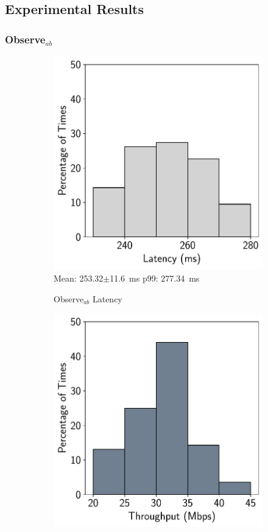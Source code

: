\subsection{Experimental Results}
\label{sec:measurements}

\subsubsection{\texorpdfstring{Observe$_{ab}$}{Observe\_ab}}
\label{sec:onion-observe-ab}

\begin{figure}[htbp]
    \centering
    \begin{subfigure}[t]{0.45\textwidth}
    \centering
    \includegraphics[width = .8\textwidth]{figs/observe-ab-latency.pdf}\\
    \small{Mean: 253.32$\pm$11.6~ms\; p99: 277.34~ms}\\
    \caption{Observe$_{ab}$ Latency}
    \label{fig:observe_ab_latency}
\end{subfigure}
\begin{subfigure}[t]{0.45\textwidth}
    \centerline{\includegraphics[width = .8\textwidth]{figs/observe-ab-throughput.pdf}}

\end{subfigure}
\end{figure}

